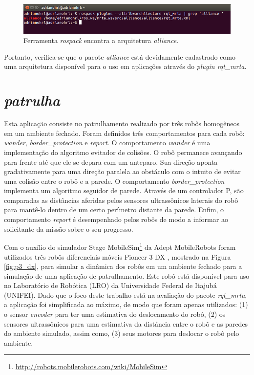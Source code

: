             \begin{figure}[htb]
                \centering
                \includegraphics[width=.95\textwidth]{Figuras/4_resultados/rqt_mrta_alliance.png}
                \caption{Ferramenta \textit{rospack} encontra a arquitetura \textit{alliance}.} \label{fig:rospack_alliance}
            \end{figure}
            
            Portanto, verifica-se que o pacote \textit{alliance} está devidamente cadastrado como uma arquitetura disponível para o uso em aplicações através do \textit{plugin rqt\_mrta}.
        
    \section{\textit{patrulha}} \label{sec:patrulha}
        Esta aplicação consiste no patrulhamento realizado por três robôs homogêneos em um ambiente fechado. Foram definidos três comportamentos para cada robô: \textit{wander}, \textit{border\_protection} e \textit{report}. O comportamento \textit{wander} é uma implementação do algoritmo evitador de colisões. O robô permanece avançando para frente até que ele se depara com um anteparo. Sua direção aponta gradativamente para uma direção paralela ao obstáculo com o intuito de evitar uma colisão entre o robô e a parede. O comportamento \textit{border\_protection} implementa um algoritmo seguidor de parede. Através de um controlador P, são comparadas as distâncias aferidas pelos sensores ultrassônicos laterais do robô para mantê-lo dentro de um certo perímetro distante da parede. Enfim, o comportamento \textit{report} é desempenhado pelos robôs de modo a informar ao solicitante da missão sobre o seu progresso.
            
        Com o auxílio do simulador Stage MobileSim\footnote{\url{http://robots.mobilerobots.com/wiki/MobileSim}} da Adept MobileRobots foram utilizados três robôs diferenciais móveis Pioneer 3 DX \cite{ref:adept2011p3dx}, mostrado na Figura \ref{fig:p3_dx}, para simular a dinâmica dos robôs em um ambiente fechado para a simulação de uma aplicação de patrulhamento. Este robô está disponível para uso no Laboratório de Robótica (LRO) da Universidade Federal de Itajubá (UNIFEI). Dado que o foco deste trabalho está na avaliação do pacote \textit{rqt\_mrta}, a aplicação foi simplificada ao máximo, de modo que foram apenas utilizados: (1) o sensor \textit{encoder} para ter uma estimativa do deslocamento do robô, (2) os sensores ultrassônicos para uma estimativa da distância entre o robô e as paredes do ambiente simulado, assim como, (3) seus motores para deslocar o robô pelo ambiente.
        
